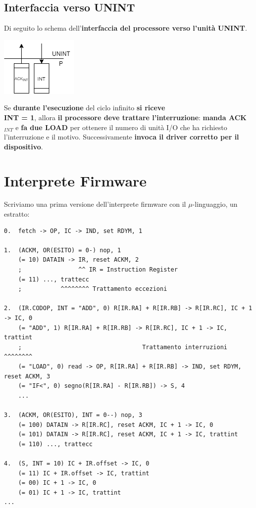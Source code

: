 \documentclass[10pt]{report}
\begin{document}
\subsection{Interfaccia verso UNINT}
Di seguito lo schema dell'\textbf{interfaccia del processore verso l'unità UNINT}.
\begin{multicols}{2}
\begin{center}
\includegraphics[scale=1.2]{interfaccia_punint.png}
\end{center}
\columnbreak
Se \textbf{durante l'esecuzione} del ciclo infinito \textbf{si riceve\\INT = 1}, allora \textbf{il processore deve trattare l'interruzione}: \textbf{manda ACK$_{INT}$} e \textbf{fa due LOAD} per ottenere il numero di unità I/O che ha richiesto l'interruzione e il motivo. Successivamente \textbf{invoca il driver corretto per il dispositivo}.
\end{multicols}
\pagebreak
\section{Interprete Firmware}
Scriviamo una prima versione dell'interprete firmware con il $\mu$-linguaggio, un estratto:
\begin{lstlisting}
0.	fetch -> OP, IC -> IND, set RDYM, 1

1.	(ACKM, OR(ESITO) = 0-) nop, 1
	(= 10) DATAIN -> IR, reset ACKM, 2
	;                ^^ IR = Instruction Register
	(= 11) ..., trattecc
	;           ^^^^^^^^ Trattamento eccezioni

2.	(IR.CODOP, INT = "ADD", 0) R[IR.RA] + R[IR.RB] -> R[IR.RC], IC + 1 -> IC, 0
	(= "ADD", 1) R[IR.RA] + R[IR.RB] -> R[IR.RC], IC + 1 -> IC, trattint
	;                                  Trattamento interruzioni ^^^^^^^^
	(= "LOAD", 0) read -> OP, R[IR.RA] + R[IR.RB] -> IND, set RDYM, reset ACKM, 3
	(= "IF<", 0) segno(R[IR.RA] - R[IR.RB]) -> S, 4
	...

3.	(ACKM, OR(ESITO), INT = 0--) nop, 3
	(= 100) DATAIN -> R[IR.RC], reset ACKM, IC + 1 -> IC, 0
	(= 101) DATAIN -> R[IR.RC], reset ACKM, IC + 1 -> IC, trattint
	(= 110) ..., trattecc
	
4.	(S, INT = 10) IC + IR.offset -> IC, 0
	(= 11) IC + IR.offset -> IC, trattint
	(= 00) IC + 1 -> IC, 0
	(= 01) IC + 1 -> IC, trattint
...
\end{lstlisting}
\end{document}
